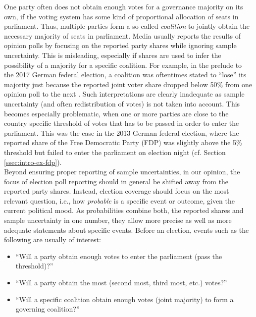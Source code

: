 \documentclass[smallcondensed]{svjour3}     %
\begin{document}
One party often does not obtain enough votes for a governance majority on its own,
if the voting system has some kind of proportional allocation of seats in
parliament. Thus, multiple parties form
a so-called \emph{coalition} to jointly obtain the necessary majority of seats
in parliament. Media usually reports the results of opinion polls by focusing
on the reported party shares while ignoring sample uncertainty. This is misleading,
especially if shares are used to infer the possibility of a majority for
a specific coalition. For example, in the prelude to the 2017 German federal election,
a coalition was oftentimes stated to ``lose'' its majority just because the reported joint
voter share dropped below 50\% from one opinion poll to the next \citep[e.g.,][]{umfrage_2017}.
Such interpretations are clearly inadequate as sample uncertainty
(and often redistribution of votes) is not taken into account. This becomes especially
problematic, when one or more parties are close to the country specific threshold
of votes that has to be passed in order to enter the parliament. This was the case
in the 2013 German federal election, where the reported share of the Free Democratic
Party (FDP) was slightly above the 5\% threshold but failed to enter the
parliament on election night (cf. Section \ref{ssec:intro-ex-fdp}).\\


Beyond ensuring proper reporting of sample uncertainties, in our opinion, the
focus of election poll reporting should in general be shifted away from the
reported party shares. Instead, election coverage should focus on the most relevant
question, i.e., how {\it probable} is a specific event or outcome, given
the current political mood. As probabilities combine both, the reported shares and
sample uncertainty in one number, they allow more precise as well as more adequate
statements about specific events. Before an election, events such as the
following are usually of interest:

\begin{itemize}
  \item ``Will a party obtain enough votes to enter the parliament (pass the threshold)?''
  \item ``Will a party obtain the most (second most, third most, etc.) votes?''
  \item ``Will a specific coalition obtain enough votes (joint majority) to form a governing coalition?''
\end{itemize}
\end{document}
